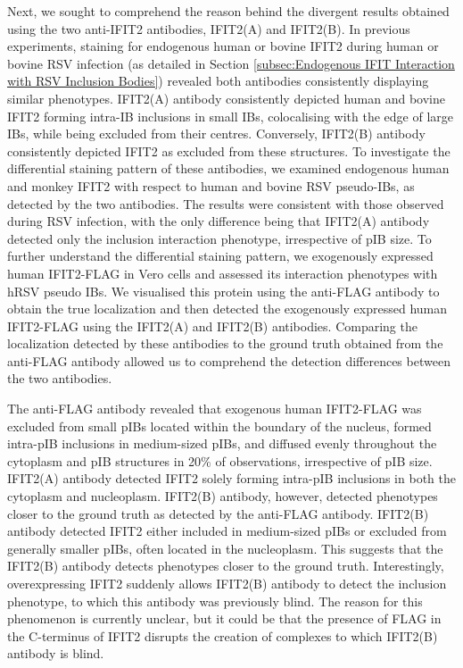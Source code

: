 Next, we sought to comprehend the reason behind the divergent results obtained using the two anti-IFIT2 antibodies, IFIT2(A) and IFIT2(B). In previous experiments, staining for endogenous human or bovine IFIT2 during human or bovine RSV infection (as detailed in Section \ref{subsec:Endogenous IFIT Interaction with RSV Inclusion Bodies}) revealed both antibodies consistently displaying similar phenotypes. IFIT2(A) antibody consistently depicted human and bovine IFIT2 forming intra-IB inclusions in small IBs, colocalising with the edge of large IBs, while being excluded from their centres. Conversely, IFIT2(B) antibody consistently depicted IFIT2 as excluded from these structures. To investigate the differential staining pattern of these antibodies, we examined endogenous human and monkey IFIT2 with respect to human and bovine RSV pseudo-IBs, as detected by the two antibodies. The results were consistent with those observed during RSV infection, with the only difference being that IFIT2(A) antibody detected only the inclusion interaction phenotype, irrespective of pIB size. To further understand the differential staining pattern, we exogenously expressed human IFIT2-FLAG in Vero cells and assessed its interaction phenotypes with hRSV pseudo IBs. We visualised this protein using the anti-FLAG antibody to obtain the true localization and then detected the exogenously expressed human IFIT2-FLAG using the IFIT2(A) and IFIT2(B) antibodies. Comparing the localization detected by these antibodies to the ground truth obtained from the anti-FLAG antibody allowed us to comprehend the detection differences between the two antibodies.

The anti-FLAG antibody revealed that exogenous human IFIT2-FLAG was excluded from small pIBs located within the boundary of the nucleus, formed intra-pIB inclusions in medium-sized pIBs, and diffused evenly throughout the cytoplasm and pIB structures in 20\% of observations, irrespective of pIB size. IFIT2(A) antibody detected IFIT2 solely forming intra-pIB inclusions in both the cytoplasm and nucleoplasm. IFIT2(B) antibody, however, detected phenotypes closer to the ground truth as detected by the anti-FLAG antibody. IFIT2(B) antibody detected IFIT2 either included in medium-sized pIBs or excluded from generally smaller pIBs, often located in the nucleoplasm. This suggests that the IFIT2(B) antibody detects phenotypes closer to the ground truth. Interestingly, overexpressing IFIT2 suddenly allows IFIT2(B) antibody to detect the inclusion phenotype, to which this antibody was previously blind. The reason for this phenomenon is currently unclear, but it could be that the presence of FLAG in the C-terminus of IFIT2 disrupts the creation of complexes to which IFIT2(B) antibody is blind.

